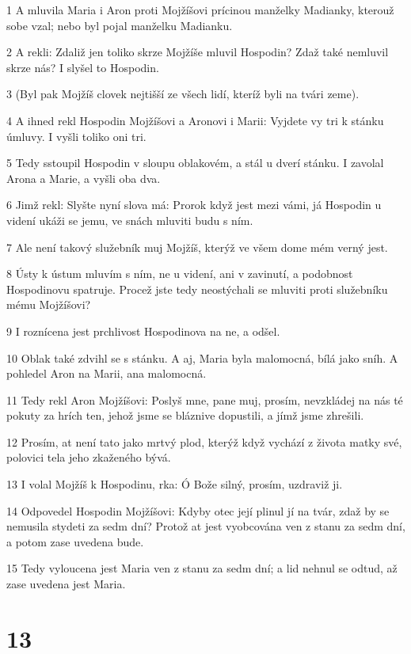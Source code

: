 \par 1 A mluvila Maria i Aron proti Mojžíšovi prícinou manželky Madianky, kterouž sobe vzal; nebo byl pojal manželku Madianku.
\par 2 A rekli: Zdaliž jen toliko skrze Mojžíše mluvil Hospodin? Zdaž také nemluvil skrze nás? I slyšel to Hospodin.
\par 3 (Byl pak Mojžíš clovek nejtišší ze všech lidí, kteríž byli na tvári zeme).
\par 4 A ihned rekl Hospodin Mojžíšovi a Aronovi i Marii: Vyjdete vy tri k stánku úmluvy. I vyšli toliko oni tri.
\par 5 Tedy sstoupil Hospodin v sloupu oblakovém, a stál u dverí stánku. I zavolal Arona a Marie, a vyšli oba dva.
\par 6 Jimž rekl: Slyšte nyní slova má: Prorok když jest mezi vámi, já Hospodin u videní ukáži se jemu, ve snách mluviti budu s ním.
\par 7 Ale není takový služebník muj Mojžíš, kterýž ve všem dome mém verný jest.
\par 8 Ústy k ústum mluvím s ním, ne u videní, ani v zavinutí, a podobnost Hospodinovu spatruje. Procež jste tedy neostýchali se mluviti proti služebníku mému Mojžíšovi?
\par 9 I roznícena jest prchlivost Hospodinova na ne, a odšel.
\par 10 Oblak také zdvihl se s stánku. A aj, Maria byla malomocná, bílá jako sníh. A pohledel Aron na Marii, ana malomocná.
\par 11 Tedy rekl Aron Mojžíšovi: Poslyš mne, pane muj, prosím, nevzkládej na nás té pokuty za hrích ten, jehož jsme se bláznive dopustili, a jímž jsme zhrešili.
\par 12 Prosím, at není tato jako mrtvý plod, kterýž když vychází z života matky své, polovici tela jeho zkaženého bývá.
\par 13 I volal Mojžíš k Hospodinu, rka: Ó Bože silný, prosím, uzdraviž ji.
\par 14 Odpovedel Hospodin Mojžíšovi: Kdyby otec její plinul jí na tvár, zdaž by se nemusila stydeti za sedm dní? Protož at jest vyobcována ven z stanu za sedm dní, a potom zase uvedena bude.
\par 15 Tedy vyloucena jest Maria ven z stanu za sedm dní; a lid nehnul se odtud, až zase uvedena jest Maria.

\chapter{13}

